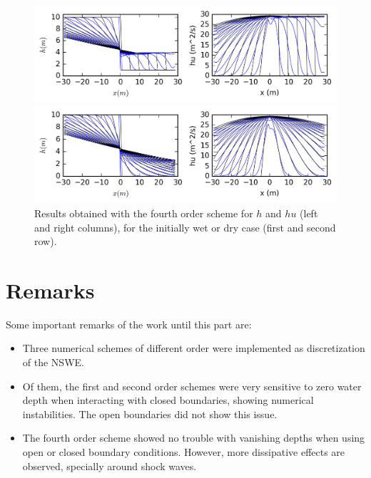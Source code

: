 	\begin{figure}[ht]
		\centering
		\includegraphics[width=\textwidth]{figures/db4_wet.png}

		\includegraphics[width=\textwidth]{figures/db4_dry.png}
		\caption{Results obtained with the fourth order scheme for $h$ and $hu$ (left and right columns), for the initially wet or dry case (first and second row). }
		\label{nswe:fourth_order}
	\end{figure}

	\section{Remarks}

	Some important remarks of the work until this part are:
	\begin{itemize}
		\item Three numerical schemes of different order were implemented as discretization of the NSWE.
		\item Of them, the first and second order schemes were very sensitive to zero water depth when interacting with closed boundaries, showing numerical instabilities. The open boundaries did not show this issue.
		\item The fourth order scheme showed no trouble with vanishing depths when using open or closed boundary conditions. However, more dissipative effects are observed, specially around shock waves.
	\end{itemize}
